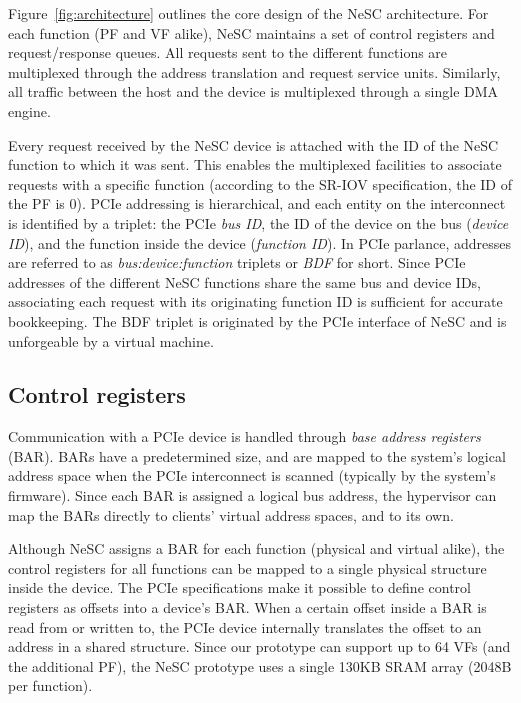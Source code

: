 Figure~\ref{fig:architecture} outlines the core design of the NeSC architecture. For each function (PF and VF alike), NeSC maintains a set of  control registers and request/response queues. All requests sent to the different functions are multiplexed through the address translation and request service units. Similarly, all traffic between the host and the device is multiplexed through a single DMA engine. 

Every request received by the NeSC device is attached with the ID of the NeSC function to which it was sent. This enables the multiplexed facilities to associate requests with a specific function (according to the SR-IOV specification, the ID of the PF is 0). PCIe addressing is hierarchical, and each entity on the interconnect is identified by a triplet: the PCIe \emph{bus ID}, the ID of the device on the bus (\emph{device ID}), and the function inside the device (\emph{function ID}). In PCIe parlance, addresses are referred to as \emph{bus:device:function} triplets or \emph{BDF} for short. Since PCIe addresses of the different NeSC functions share the same bus and device IDs, associating each request with its originating function ID is sufficient for accurate bookkeeping.
The BDF triplet is originated by the PCIe interface of NeSC and is unforgeable by a virtual machine.   



\subsection*{Control registers}
Communication with a PCIe device is handled through \emph{base address registers} (BAR). BARs have a predetermined size, and are mapped to the system's logical address space when the PCIe interconnect is scanned (typically by the system's firmware). Since each BAR is assigned a logical bus address, the hypervisor can map the BARs directly to clients' virtual address spaces, and to its own.

Although NeSC assigns a BAR for each function (physical and virtual alike), the control registers for all functions can be mapped to a single physical structure inside the device.
The PCIe specifications make it possible to define control registers as offsets into a device's BAR. When a certain offset inside a BAR is read from or written to, the PCIe device internally translates the offset to an address in a shared structure.
Since our prototype can support up to 64 VFs (and the additional PF), the NeSC prototype uses a single 130KB SRAM array (2048B per function).

